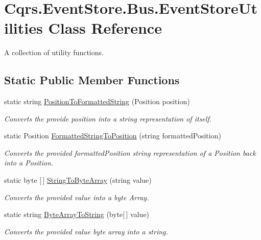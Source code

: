 \hypertarget{classCqrs_1_1EventStore_1_1Bus_1_1EventStoreUtilities}{}\section{Cqrs.\+Event\+Store.\+Bus.\+Event\+Store\+Utilities Class Reference}
\label{classCqrs_1_1EventStore_1_1Bus_1_1EventStoreUtilities}


A collection of utility functions.  


\subsection*{Static Public Member Functions}
\begin{DoxyCompactItemize}
\item 
static string \hyperlink{classCqrs_1_1EventStore_1_1Bus_1_1EventStoreUtilities_aba4f88ffbd314a485ced0c0528b5cd9b_aba4f88ffbd314a485ced0c0528b5cd9b}{Position\+To\+Formatted\+String} (Position position)
\begin{DoxyCompactList}\small\item\em Converts the provide {\itshape position}  into a string representation of itself. \end{DoxyCompactList}\item 
static Position \hyperlink{classCqrs_1_1EventStore_1_1Bus_1_1EventStoreUtilities_a69b19078c9835cb4f7c7b903fa5ca1eb_a69b19078c9835cb4f7c7b903fa5ca1eb}{Formatted\+String\+To\+Position} (string formatted\+Position)
\begin{DoxyCompactList}\small\item\em Converts the provided {\itshape formatted\+Position} string representation of a Position back into a Position. \end{DoxyCompactList}\item 
static byte \mbox{[}$\,$\mbox{]} \hyperlink{classCqrs_1_1EventStore_1_1Bus_1_1EventStoreUtilities_a1bf8620c91556b5e0e804a2467711989_a1bf8620c91556b5e0e804a2467711989}{String\+To\+Byte\+Array} (string value)
\begin{DoxyCompactList}\small\item\em Converts the provided {\itshape value}  into a byte Array. \end{DoxyCompactList}\item 
static string \hyperlink{classCqrs_1_1EventStore_1_1Bus_1_1EventStoreUtilities_af4b4ca47a50ce0c037625c0bc8ae6d49_af4b4ca47a50ce0c037625c0bc8ae6d49}{Byte\+Array\+To\+String} (byte\mbox{[}$\,$\mbox{]} value)
\begin{DoxyCompactList}\small\item\em Converts the provided {\itshape value} byte array into a string. \end{DoxyCompactList}\end{DoxyCompactItemize}


